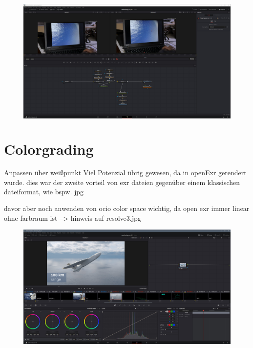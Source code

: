 \begin{figure}[H]
\begin{center}
\includegraphics[width=\textwidth]{gfx/post/resolve10.jpg}
\caption{}
\label{resolve10}
\end{center}
\end{figure}


\section{Colorgrading}

Anpassen über weißpunkt
Viel Potenzial übrig gewesen, da in openExr gerendert wurde.
dies war der zweite vorteil von exr dateien gegenüber einem klassischen dateiformat, wie bspw. jpg

davor aber noch anwenden von ocio color space wichtig, da open exr immer linear ohne farbraum ist
--> hinweis auf resolve3.jpg



\begin{figure}[H]
\begin{center}
\includegraphics[width=\textwidth]{gfx/post/resolve7.jpg}
\caption{}
\label{resolve7}
\end{center}
\end{figure}

